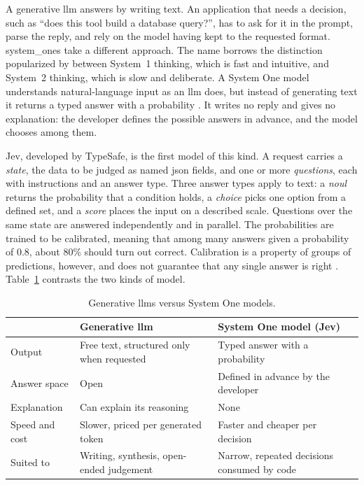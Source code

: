 A generative \gls{llm} answers by writing text. An application that needs a decision, such as ``does this tool build a database query?'', has to ask for it in the prompt, parse the reply, and rely on the model having kept to the requested format. \Glspl{system_one} take a different approach. The name borrows the distinction popularized by \citet{kahneman2011thinking} between System~1 thinking, which is fast and intuitive, and System~2 thinking, which is slow and deliberate. A System One model understands natural-language input as an \gls{llm} does, but instead of generating text it returns a typed answer with a probability \citep{typesafe2026systemone}. It writes no reply and gives no explanation: the developer defines the possible answers in advance, and the model chooses among them.

Jev, developed by TypeSafe, is the first model of this kind. A request carries a \emph{state}, the data to be judged as named \acrshort{json} fields, and one or more \emph{questions}, each with instructions and an answer type. Three answer types apply to text: a \emph{noul} returns the probability that a condition holds, a \emph{choice} picks one option from a defined set, and a \emph{score} places the input on a described scale. Questions over the same state are answered independently and in parallel. The probabilities are trained to be calibrated, meaning that among many answers given a probability of 0.8, about 80\% should turn out correct. Calibration is a property of groups of predictions, however, and does not guarantee that any single answer is right \citep{typesafe2026systemone}. Table~\ref{tab:llm-vs-s1} contrasts the two kinds of model.

\begin{table}[htbp]
\centering
\small
\begin{tabular}{p{2.6cm} >{\raggedright\arraybackslash}p{5.4cm} >{\raggedright\arraybackslash}p{5.4cm}}
\hline
 & \textbf{Generative \acrshort{llm}} & \textbf{System One model (Jev)} \\
\hline
Output & Free text, structured only when requested & Typed answer with a probability \\
Answer space & Open & Defined in advance by the developer \\
Explanation & Can explain its reasoning & None \\
Speed and cost & Slower, priced per generated token & Faster and cheaper per decision \\
Suited to & Writing, synthesis, open-ended judgement & Narrow, repeated decisions consumed by code \\
\hline
\end{tabular}
\caption{Generative \glspl{llm} versus System One models.}
\label{tab:llm-vs-s1}
\end{table}


